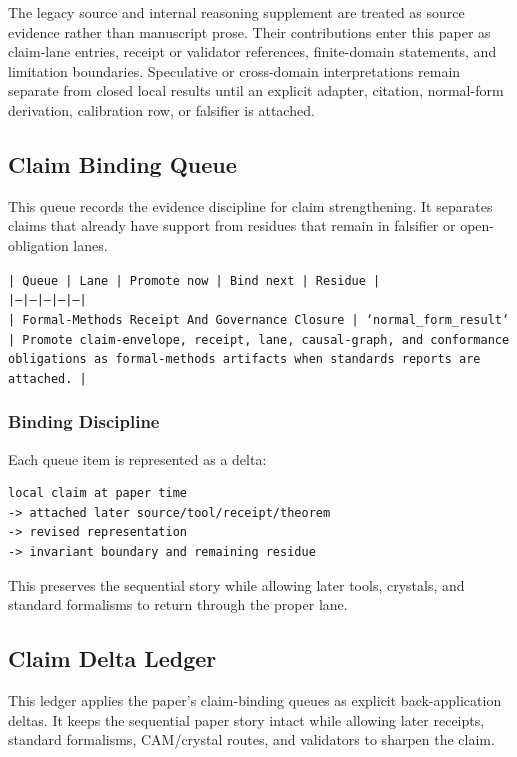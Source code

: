 \documentclass[11pt]{article}
\begin{document}
The legacy source and internal reasoning supplement are treated as source
evidence rather than manuscript prose. Their contributions enter this paper as
claim-lane entries, receipt or validator references, finite-domain statements,
and limitation boundaries. Speculative or cross-domain interpretations remain
separate from closed local results until an explicit adapter, citation,
normal-form derivation, calibration row, or falsifier is attached.
\subsection*{Claim Binding Queue}

This queue records the evidence discipline for claim strengthening. It separates claims that already have support from residues that remain in falsifier or open-obligation lanes.

\noindent\texttt{| Queue | Lane | Promote now | Bind next | Residue |}\\
\noindent\texttt{|---|---|---|---|---|}\\
\noindent\texttt{| Formal-Methods Receipt And Governance Closure | `normal\_form\_result` | Promote claim-envelope, receipt, lane, causal-graph, and conformance obligations as formal-methods artifacts when standards reports are attached. |}\\

\subsubsection*{Binding Discipline}

Each queue item is represented as a delta:

\begin{verbatim}
local claim at paper time
-> attached later source/tool/receipt/theorem
-> revised representation
-> invariant boundary and remaining residue
\end{verbatim}

This preserves the sequential story while allowing later tools, crystals, and
standard formalisms to return through the proper lane.

\subsection*{Claim Delta Ledger}

This ledger applies the paper's claim-binding queues as explicit back-application
deltas. It keeps the sequential paper story intact while allowing later
receipts, standard formalisms, CAM/crystal routes, and validators to sharpen the
claim.
\end{document}
